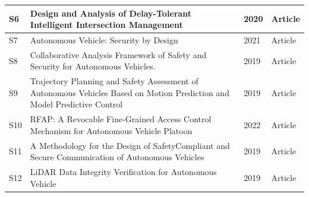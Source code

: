 \documentclass[a4paper,12pt]{article}
\begin{document}
\begin{table}[hbt!]
{\begin{tabular}{|l|l|l|l|}
S6                                                                               & Design and Analysis of Delay-Tolerant Intelligent Intersection Management                                                 & 2020                                                                              & Article                                                                           \\ \hline
S7                                                                               & Autonomous Vehicle: Security by Design                                                                                    & 2021                                                                              & Article                                                                           \\ \hline
S8                                                                               & Collaborative Analysis Framework of Safety and Security for Autonomous Vehicles.                                          & 2019                                                                              & Article                                                                           \\ \hline
S9                                                                               & Trajectory Planning and Safety Assessment of Autonomous Vehicles Based on Motion Prediction and Model Predictive Control  & 2019                                                                              & Article                                                                           \\ \hline
S10                                                                              & RFAP: A Revocable Fine-Grained Access Control Mechanism for Autonomous Vehicle Platoon                                    & 2022                                                                              & Article                                                                           \\ \hline
S11                                                                              & A Methodology for the Design of SafetyCompliant and Secure Communication of Autonomous Vehicles                           & 2019                                                                              & Article                                                                           \\ \hline
S12                                                                              & LiDAR Data Integrity Verification for Autonomous Vehicle                                                                  & 2019                                                                              & Article                                                                           \\ \hline

\end{tabular}}
\end{table}
\end{document}

